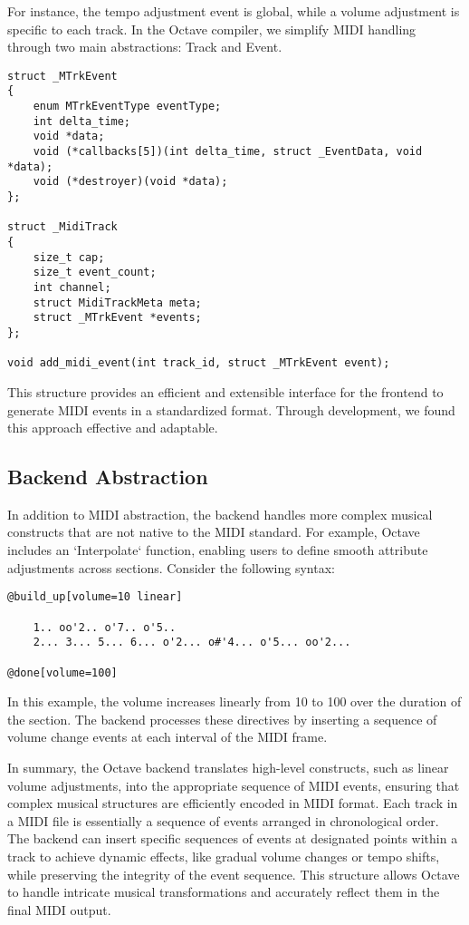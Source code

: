 \documentclass[letterpaper,12pt]{article}
\begin{document}
For instance, the tempo adjustment event is global, while a volume adjustment is specific to each track. In the Octave compiler, we simplify MIDI handling through two main abstractions: Track and Event.

\begin{verbatim}
struct _MTrkEvent
{
    enum MTrkEventType eventType;
    int delta_time;
    void *data;
    void (*callbacks[5])(int delta_time, struct _EventData, void *data);
    void (*destroyer)(void *data);
};

struct _MidiTrack
{
    size_t cap;
    size_t event_count;
    int channel;
    struct MidiTrackMeta meta;
    struct _MTrkEvent *events;
};

void add_midi_event(int track_id, struct _MTrkEvent event);
\end{verbatim}

This structure provides an efficient and extensible interface for the frontend to generate MIDI events in a standardized format. Through development, we found this approach effective and adaptable.

\subsection{Backend Abstraction}

In addition to MIDI abstraction, the backend handles more complex musical constructs that are not native to the MIDI standard. For example, Octave includes an `Interpolate` function, enabling users to define smooth attribute adjustments across sections. Consider the following syntax:

\begin{verbatim}
@build_up[volume=10 linear]

    1.. oo'2.. o'7.. o'5.. 
    2... 3... 5... 6... o'2... o#'4... o'5... oo'2...

@done[volume=100]
\end{verbatim}

In this example, the volume increases linearly from 10 to 100 over the duration of the section. The backend processes these directives by inserting a sequence of volume change events at each interval of the MIDI frame.

In summary, the Octave backend translates high-level constructs, such as linear volume adjustments, into the appropriate sequence of MIDI events, ensuring that complex musical structures are efficiently encoded in MIDI format. Each track in a MIDI file is essentially a sequence of events arranged in chronological order. The backend can insert specific sequences of events at designated points within a track to achieve dynamic effects, like gradual volume changes or tempo shifts, while preserving the integrity of the event sequence. This structure allows Octave to handle intricate musical transformations and accurately reflect them in the final MIDI output.
\end{document}
